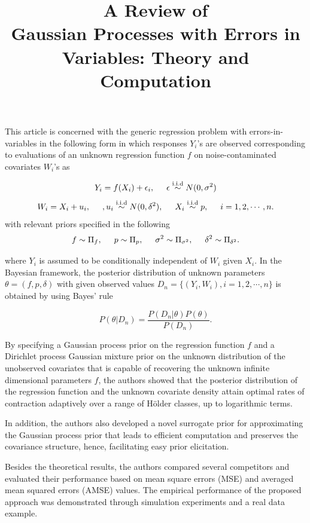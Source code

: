 \documentclass[11pt]{article}
\title{A Review of \\ Gaussian Processes with Errors in Variables: Theory and
	Computation}
\begin{document}
	\maketitle	
	
This article is concerned with the generic regression problem with errors-in-variables in the following form in which responses $Y_i$’s are observed corresponding to evaluations of an unknown regression function $f$ on noise-contaminated covariates $W_i$’s as

$$
Y_i = f(X_i) + \epsilon_i, \hspace{5mm} \epsilon \stackrel{\text{i.i.d}}{\sim} N(0, \sigma^2)
$$
$$
W_i = X_i + u_i, \hspace{5mm}, u_i \stackrel{\text{i.i.d}}{\sim}  N(0, \delta^2), \hspace{5mm} X_i \stackrel{\text{i.i.d}}{\sim} p, \hspace{5mm} i = 1, 2, \cdots, n.
$$
\noindent with relevant priors specified in the following
$$
f \sim \Pi_f, \hspace{5mm} p \sim \Pi_p, \hspace{5mm}\sigma^2 \sim \Pi_{\sigma^2}, \hspace{5mm} \delta^2 \sim \Pi_{\delta^2}.
$$

\noindent where $Y_i$ is assumed to be conditionally independent of $W_i$ given $X_i$. In the Bayesian framework, the posterior distribution of unknown parameters $\theta = (f, p, \delta)$ with given observed values $D_n = \{(Y_i, W_i), i = 1, 2, \cdots, n\}$ is obtained by using Bayes’ rule

$$
P(\theta|D_n) = \frac{P(D_n|\theta) P(\theta)}{P(D_n)}.
$$

By specifying a Gaussian process prior on the regression function $f$ and a Dirichlet process Gaussian mixture prior on the unknown distribution of the unobserved covariates that is capable of recovering the unknown infinite dimensional parameters $f$, the authors showed that the posterior distribution of the regression function and the unknown covariate density attain optimal rates of contraction adaptively over a range of H\"{o}lder classes, up to logarithmic terms. 

In addition, the authors also developed a novel surrogate prior for approximating the Gaussian process prior that leads to efficient computation and preserves the covariance structure, hence, facilitating easy prior elicitation.

Besides the theoretical results, the authors compared several competitors and evaluated their performance based on mean square errors (MSE) and averaged mean squared errors (AMSE) values. The empirical performance of the proposed approach was demonstrated through simulation experiments and a real data example.


	
\end{document}
